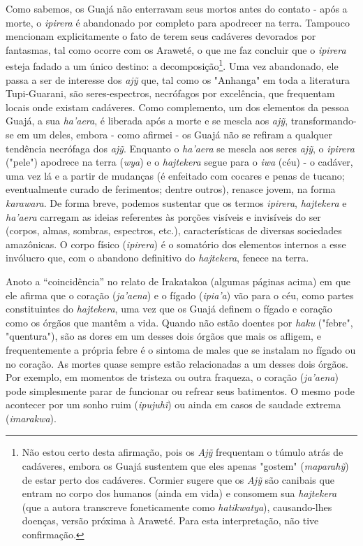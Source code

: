 Como sabemos, os Guajá não enterravam seus mortos antes do contato -
após a morte, o \emph{ipirera} é abandonado por completo para apodrecer
na terra. Tampouco mencionam explicitamente o fato de terem seus
cadáveres devorados por fantasmas, tal como ocorre com os Araweté, o que
me faz concluir que o \emph{ipirera} esteja fadado a um único destino: a
decomposição\footnote{Não estou certo desta afirmação, pois os
  \emph{Ajỹ} frequentam o túmulo atrás de cadáveres, embora os Guajá
  sustentem que eles apenas "gostem" (\emph{maparahỹ}) de estar perto
  dos cadáveres. Cormier sugere que os \emph{Ajỹ} são canibais que
  entram no corpo dos humanos (ainda em vida) e consomem sua
  \emph{hajtekera} (que a autora transcreve foneticamente como
  \emph{hatikwatya}), causando-lhes doenças, versão próxima à Araweté.
  Para esta interpretação, não tive confirmação.}. Uma vez abandonado,
ele passa a ser de interesse dos \emph{ajỹ} que, tal como os "Anhanga"
em toda a literatura Tupi-Guarani, são seres-espectros, necrófagos por
excelência, que frequentam locais onde existam cadáveres. Como
complemento, um dos elementos da pessoa Guajá, a sua \emph{ha'aera}, é
liberada após a morte e se mescla aos \emph{ajỹ}, transformando-se em um
deles, embora - como afirmei - os Guajá não se refiram a qualquer
tendência necrófaga dos \emph{ajỹ}. Enquanto o \emph{ha'aera} se mescla
aos seres \emph{ajỹ}, o \emph{ipirera} ("pele") apodrece na terra
(\emph{wya}) e o \emph{hajtekera} segue para o \emph{iwa} (céu) - o
cadáver, uma vez lá e a partir de mudanças (é enfeitado com cocares e
penas de tucano; eventualmente curado de ferimentos; dentre outros),
renasce jovem, na forma \emph{karawara}. De forma breve, podemos
sustentar que os termos \emph{ipirera}, \emph{hajtekera} e
\emph{ha'aera} carregam as ideias referentes às porções visíveis e
invisíveis do ser (corpos, almas, sombras, espectros, etc.),
características de diversas sociedades amazônicas. O corpo físico
(\emph{ipirera}) é o somatório dos elementos internos a esse invólucro
que, com o abandono definitivo do \emph{hajtekera}, fenece na terra.

Anoto a ``coincidência'' no relato de Irakatakoa (algumas páginas acima)
em que ele afirma que o coração (\emph{ja'aena}) e o fígado
(\emph{ipia'a}) vão para o céu, como partes constituintes do
\emph{hajtekera}, uma vez que os Guajá definem o fígado e coração como
os órgãos que mantêm a vida. Quando não estão doentes por \emph{haku}
("febre", "quentura"), são as dores em um desses dois órgãos que mais os
afligem, e frequentemente a própria febre é o sintoma de males que se
instalam no fígado ou no coração. As mortes quase sempre estão
relacionadas a um desses dois órgãos. Por exemplo, em momentos de
tristeza ou outra fraqueza, o coração (\emph{ja'aena}) pode simplesmente
parar de funcionar ou refrear seus batimentos. O mesmo pode acontecer
por um sonho ruim (\emph{ipujuhĩ}) ou ainda em casos de saudade extrema
(\emph{imarakwa}).

